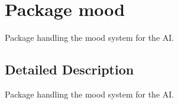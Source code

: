 \hypertarget{namespacemood}{\section{Package mood}
\label{namespacemood}
}


Package handling the mood system for the A\-I.  




\subsection{Detailed Description}
Package handling the mood system for the A\-I. 